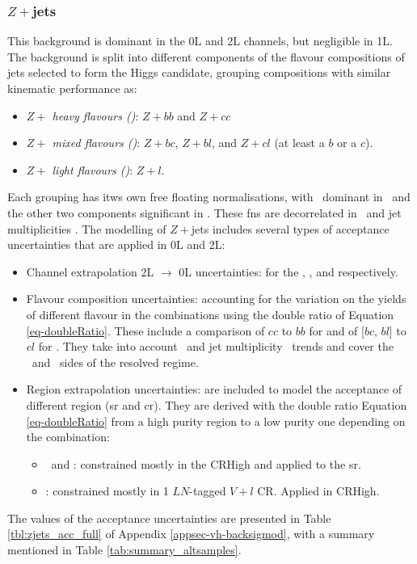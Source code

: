\subsubsection{$Z+$jets}
This background is dominant in the 0L and 2L channels, but negligible in 1L. The background is split into different components of the flavour compositions of jets selected to form the Higgs candidate, grouping compositions with similar kinematic performance as:   
\begin{itemize}
    \item \textit{$Z+$ heavy flavours (\zhf)}: $Z+bb$ and $Z+cc$
    \item \textit{$Z+$ mixed flavours (\zmf)}: $Z+bc$, $Z+bl$, and $Z+cl$ (at least a $b$ or a $c$).
    \item \textit{$Z+$ light flavours (\zlf)}: $Z+l$.
\end{itemize}
Each grouping has itws own free floating normalisations, with \zhf\ dominant in \vhb\ and the other two components significant in \vhc. These \gls{fn}s are decorrelated in \ptv\ and jet multiplicities \nj. The modelling of $Z+$jets includes several types of acceptance uncertainties that are applied in 0L and 2L:
\begin{itemize}[leftmargin=*]
    \item Channel extrapolation 2L $\rightarrow$ 0L uncertainties: for the \zhf, \zmf, and \zlf respectively. 
    \item Flavour composition uncertainties: accounting for the variation on the yields of different flavour in the combinations using the double ratio of Equation \ref{eq-doubleRatio}. These include a comparison of $cc$ to $bb$ for \zhf and of [$bc$, $bl$] to $cl$ for \zmf. They take into account \ptv\ and jet multiplicity \nj\ trends and cover the \vhb\ and \vhc\ sides of the resolved regime. 
    \item Region extrapolation uncertainties: are included to model the acceptance of different region (\gls{sr} and \gls{cr}). They are derived with the double ratio Equation \ref{eq-doubleRatio} from a high purity region to a low purity one depending on the combination:
    \begin{itemize}
        \item \zhf\ and \zmf: constrained mostly in the CRHigh and applied to the \gls{sr}. 
        \item \zlf: constrained mostly in 1 $LN$-tagged $V+l$ CR. Applied in CRHigh. %
    \end{itemize}
\end{itemize}
The values of the acceptance uncertainties are presented in Table \ref{tbl:zjets_acc_full} of Appendix \ref{appsec-vh-backsigmod}, with a summary mentioned in Table \ref{tab:summary_altsamples}.

